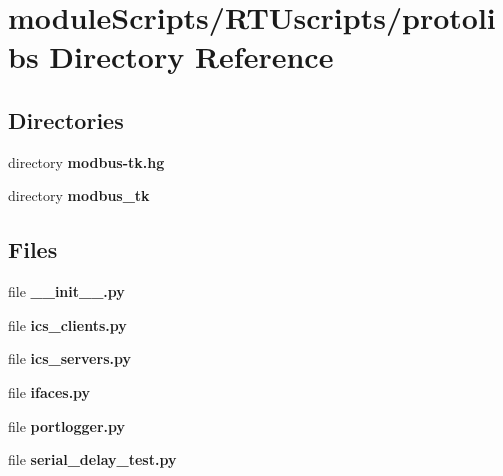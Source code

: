 \section{module\+Scripts/\+R\+T\+Uscripts/protolibs Directory Reference}
\label{dir_5e38ae42643751523b793e9d080b3eb1}
\subsection*{Directories}
\begin{DoxyCompactItemize}
\item 
directory {\bf modbus-\/tk.\+hg}
\item 
directory {\bf modbus\+\_\+tk}
\end{DoxyCompactItemize}
\subsection*{Files}
\begin{DoxyCompactItemize}
\item 
file {\bf \+\_\+\+\_\+init\+\_\+\+\_\+.\+py}
\item 
file {\bf ics\+\_\+clients.\+py}
\item 
file {\bf ics\+\_\+servers.\+py}
\item 
file {\bf ifaces.\+py}
\item 
file {\bf portlogger.\+py}
\item 
file {\bf serial\+\_\+delay\+\_\+test.\+py}
\end{DoxyCompactItemize}
